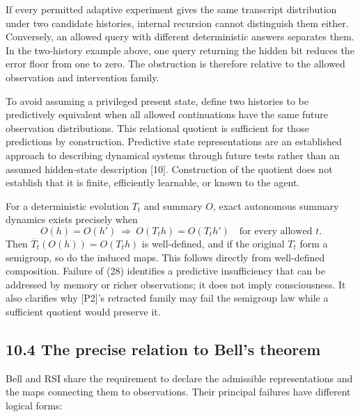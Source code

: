 \documentclass[
]{article}
\begin{document}
If every permitted adaptive experiment gives the same transcript distribution under two candidate histories, internal recursion cannot distinguish them either. Conversely, an allowed query with different deterministic answers separates them. In the two-history example above, one query returning the hidden bit reduces the error floor from one to zero. The obstruction is therefore relative to the allowed observation and intervention family.

To avoid assuming a privileged present state, define two histories to be predictively equivalent when all allowed continuations have the same future observation distributions. This relational quotient is sufficient for those predictions by construction. Predictive state representations are an established approach to describing dynamical systems through future tests rather than an assumed hidden-state description {[}10{]}. Construction of the quotient does not establish that it is finite, efficiently learnable, or known to the agent.

For a deterministic evolution \(T_t\) and summary \(O\), exact autonomous summary dynamics exists precisely when
\[
O(h)=O(h')\ \Longrightarrow\ O(T_t h)=O(T_t h')
\quad\text{for every allowed }t.
\tag{28}
\]
Then \(\overline T_t(O(h))=O(T_t h)\) is well-defined, and if the original \(T_t\) form a semigroup, so do the induced maps. This follows directly from well-defined composition. Failure of (28) identifies a predictive insufficiency that can be addressed by memory or richer observations; it does not imply consciousness. It also clarifies why {[}P2{]}'s retracted family may fail the semigroup law while a sufficient quotient would preserve it.

\subsection{10.4 The precise relation to Bell's theorem}\label{the-precise-relation-to-bells-theorem}

Bell and RSI share the requirement to declare the admissible representations and the maps connecting them to observations. Their principal failures have different logical forms:
\end{document}
